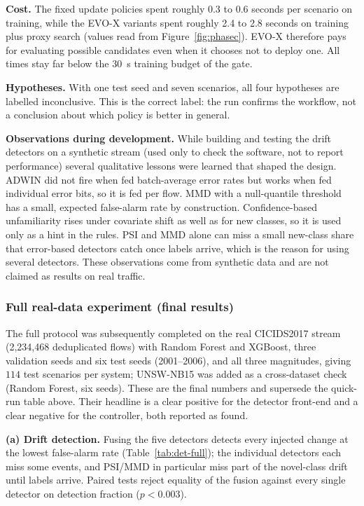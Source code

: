 \documentclass{article}
\begin{document}
\textbf{Cost.} The fixed update policies spent roughly 0.3 to 0.6 seconds per scenario on training, while the EVO-X variants spent roughly 2.4 to 2.8 seconds on training plus proxy search (values read from Figure~\ref{fig:phasec}). EVO-X therefore pays for evaluating possible candidates even when it chooses not to deploy one. All times stay far below the 30~s training budget of the gate.

\textbf{Hypotheses.} With one test seed and seven scenarios, all four hypotheses are labelled inconclusive. This is the correct label: the run confirms the workflow, not a conclusion about which policy is better in general.

\textbf{Observations during development.} While building and testing the drift detectors on a synthetic stream (used only to check the software, not to report performance) several qualitative lessons were learned that shaped the design. ADWIN did not fire when fed batch-average error rates but works when fed individual error bits, so it is fed per flow. MMD with a null-quantile threshold has a small, expected false-alarm rate by construction. Confidence-based unfamiliarity rises under covariate shift as well as for new classes, so it is used only as a hint in the rules. PSI and MMD alone can miss a small new-class share that error-based detectors catch once labels arrive, which is the reason for using several detectors. These observations come from synthetic data and are not claimed as results on real traffic.

\subsubsection*{Full real-data experiment (final results)}
\label{sec:fullplan}

The full protocol was subsequently completed on the real CICIDS2017 stream (2{,}234{,}468 deduplicated flows) with Random Forest and XGBoost, three validation seeds and six test seeds (2001--2006), and all three magnitudes, giving $114$ test scenarios per system; UNSW-NB15 was added as a cross-dataset check (Random Forest, six seeds). These are the final numbers and supersede the quick-run table above. Their headline is a clear positive for the detector front-end and a clear negative for the controller, both reported as found.

\textbf{(a) Drift detection.} Fusing the five detectors detects every injected change at the lowest false-alarm rate (Table~\ref{tab:det-full}); the individual detectors each miss some events, and PSI/MMD in particular miss part of the novel-class drift until labels arrive. Paired tests reject equality of the fusion against every single detector on detection fraction ($p<0.003$).
\end{document}
